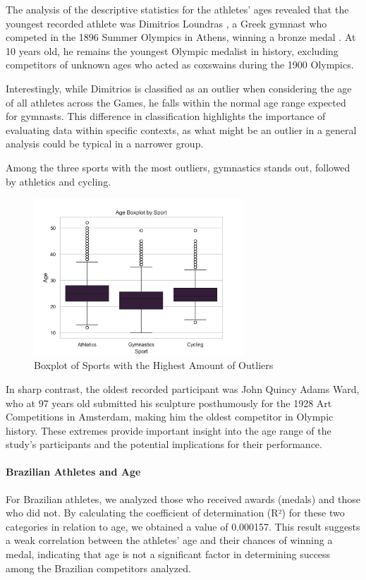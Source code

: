 \documentclass{article}
\begin{document}
The analysis of the descriptive statistics for the athletes' ages revealed that the youngest recorded athlete was Dimitrios Loundras \cite{olympedia}, a Greek gymnast who competed in the 1896 Summer Olympics in Athens, winning a bronze medal \cite{OlympicsDimitri}. At 10 years old, he remains the youngest Olympic medalist in history, excluding competitors of unknown ages who acted as coxswains during the 1900 Olympics.

Interestingly, while Dimitrios is classified as an outlier when considering the age of all athletes across the Games, he falls within the normal age range expected for gymnasts. This difference in classification highlights the importance of evaluating data within specific contexts, as what might be an outlier in a general analysis could be typical in a narrower group.

Among the three sports with the most outliers, gymnastics stands out, followed by athletics and cycling.

\begin{figure}[H]
\centering
\includegraphics[width=0.7\textwidth]{images/age_analysis/bloxplot_top_3_highest_age_aplitude.png}
\caption{\label{fig3}Boxplot of Sports with the Highest Amount of Outliers}
\end{figure}

In sharp contrast, the oldest recorded participant was John Quincy Adams Ward, who at 97 years old submitted his sculpture posthumously for the 1928 Art Competitions in Amsterdam, making him the oldest competitor in Olympic history. These extremes provide important insight into the age range of the study's participants and the potential implications for their performance.

\paragraph{Brazilian Athletes and Age}
For Brazilian athletes, we analyzed those who received awards (medals) and those who did not. By calculating the coefficient of determination (R²) for these two categories in relation to age, we obtained a value of 0.000157. This result suggests a weak correlation between the athletes' age and their chances of winning a medal, indicating that age is not a significant factor in determining success among the Brazilian competitors analyzed.
\end{document}

